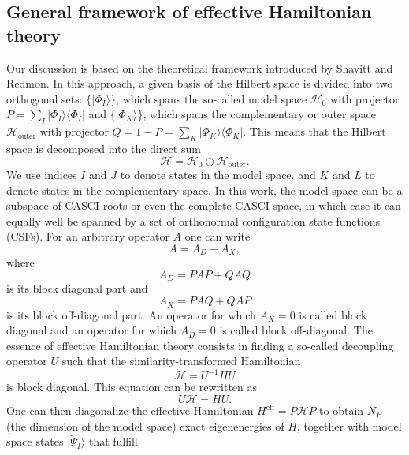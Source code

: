\subsection{General framework of effective Hamiltonian theory}
Our discussion is based on the theoretical framework introduced by Shavitt and Redmon.\cite{ShaviR_1980_5711} In this approach, a given basis of the Hilbert space is divided into two orthogonal sets: $\{ |{\Phi _I}\rangle \} $, which spans the so-called model space $\mathcal{H}_0$ with projector $P = \sum_I | {\Phi _I}\rangle \langle {\Phi _I}|$ and $\{ |{\Phi _K}\rangle \} $, which spans the complementary or outer space $\mathcal{H}_\text{outer}$ with projector $Q = 1 - P = \sum_K | {\Phi _K}\rangle \langle {\Phi _K}|$. This means that the Hilbert space is decomposed into the direct sum
\begin{equation}
\mathcal{H} = \mathcal{H}_0 \oplus \mathcal{H}_\text{outer}.
\end{equation}
We use indices $I$ and $J$ to denote states in the model space, and $K$ and $L$ to denote states in the complementary space. In this work, the model space can be a subspace of CASCI roots or even the complete CASCI space, in which case it can equally well be spanned by a set of orthonormal configuration state functions (CSFs). For an arbitrary operator $A$ one can write
	\begin{equation}
	A = {A_D} + {A_X},
	\end{equation} 	
where 
	\begin{equation}
	{A_D} = PAP + QAQ
	\end{equation} 	
is its block diagonal part and
	\begin{equation}
	{A_X} = PAQ + QAP
	\end{equation} 	
is its block off-diagonal part. An operator for which ${A_X} = 0$ is called block diagonal and an operator for which ${A_D} = 0$ is called block off-diagonal.
The essence of effective Hamiltonian theory consists in finding a so-called decoupling operator $U$ such that the similarity-transformed Hamiltonian
	\begin{equation}
	\mathcal{H} = {U^{ - 1}}HU
	\end{equation} 	
is block diagonal.\cite{ShaviR_1980_5711} This equation can be rewritten as
	\begin{equation}
	\label{Eq:Bloch_nonprojected}
	U\mathcal{H} = HU.
	\end{equation} 	
One can then diagonalize the effective Hamiltonian ${H^{{\text{eff}}}} = P\mathcal{H}P$ to obtain ${N_P}$ (the dimension of the model space) exact eigenenergies of $H$, together with model space states $|{\tilde \Psi _I}\rangle $ that fulfill
